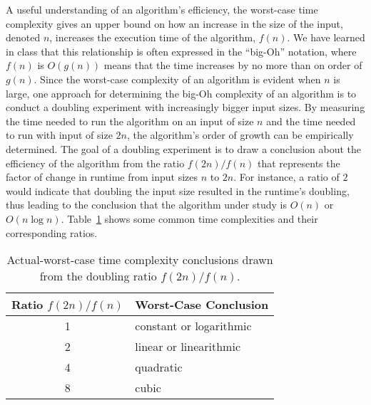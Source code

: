A useful understanding of an algorithm's efficiency, the worst-case time complexity gives an upper bound on how an
increase in the size of the input, denoted $n$, increases the execution time of the algorithm, $f(n)$. We have learned
in class that this relationship is often expressed in the ``big-Oh'' notation, where $f(n)$ is $O(g(n))$ means that the
time increases by no more than on order of $g(n)$. Since the worst-case complexity of an algorithm is evident when $n$
is large, one approach for determining the big-Oh complexity of an algorithm is to conduct a doubling experiment with
increasingly bigger input sizes. By measuring the time needed to run the algorithm on an input of size $n$ and the time
needed to run with input of size $2n$, the algorithm's order of growth can be empirically determined.
The goal of a doubling experiment is to draw a conclusion about the efficiency of the algorithm from the ratio
$f(2n)/f(n)$ that represents the factor of change in runtime from input sizes $n$ to $2n$. For instance, a ratio of $2$
would indicate that doubling the input size resulted in the runtime's doubling, thus leading to the conclusion that the
algorithm under study is $O(n)$ or $O(n\log n)$. Table~\ref{table:ratios} shows some common time complexities and their
corresponding ratios.

\begin{table}[t]

  \begin{center}

    \begin{tabular}{c|l}
      Ratio $f(2n)/f(n)$ & Worst-Case Conclusion              \\ \hline
      1                  & constant or logarithmic \\
      2                  & linear or linearithmic  \\
      4                  & quadratic               \\
      8                  & cubic                   \\
    \end{tabular}

  \end{center}
  \vspace*{-.25in}

  \caption{Actual-worst-case time complexity conclusions drawn from the doubling ratio $f(2n)/f(n)$.}\label{table:ratios}

\end{table}

